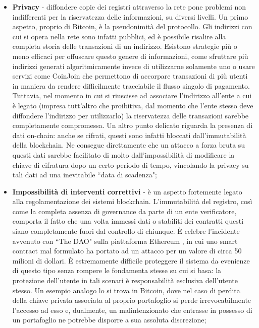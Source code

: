 \begin{itemize}
				\item \textbf{Privacy} - diffondere copie dei registri attraverso la rete pone problemi non indifferenti per la riservatezza delle informazioni, su diversi livelli. Un primo aspetto, proprio di Bitcoin, è la pseudonimità del protocollo. Gli indirizzi con cui si opera nella rete sono infatti pubblici, ed è possibile risalire alla completa storia delle transazioni di un indirizzo. Esistono strategie più o meno efficaci per offuscare questo genere di informazioni, come sfruttare più indirizzi generati algoritmicamente invece di utilizzarne solamente uno o usare servizi come CoinJoin che permettono di accorpare transazioni di più utenti in maniera da rendere difficilmente tracciabile il flusso singolo di pagamento. Tuttavia, nel momento in cui si riuscisse ad associare l'indirizzo all'ente a cui è legato (impresa tutt'altro che proibitiva, dal momento che l'ente stesso deve diffondere l'indirizzo per utilizzarlo) la riservatezza delle transazioni sarebbe completamente compromessa. Un altro punto delicato riguarda la presenza di dati on-chain: anche se cifrati, questi sono infatti bloccati dall'immutabilità della blockchain. Ne consegue direttamente che un attacco a forza bruta su questi dati sarebbe facilitato di molto dall'impossibilità di modificare la chiave di cifratura dopo un certo periodo di tempo, vincolando la privacy su tali dati ad una inevitabile ``data di scadenza"; 
				\item \textbf{Impossibilità di interventi correttivi} - è un aspetto fortemente legato alla regolamentazione dei sistemi blockchain. L'immutabilità del registro, così come la completa assenza di governance da parte di un ente verificatore, comporta il fatto che una volta immessi dati o stabiliti dei contratti questi siano completamente fuori dal controllo di chiunque. È celebre l'incidente avvenuto con ``The DAO" sulla piattaforma Ethereum \cite{theDAO}, in cui uno smart contract mal formulato ha portato ad un attacco per un valore di circa 50 milioni di dollari. È estremamente difficile proteggere il sistema da evenienze di questo tipo senza rompere le fondamenta stesse su cui si basa: la protezione dell'utente in tali scenari è responsabilità esclusiva dell'utente stesso. Un esempio analogo lo si trova in Bitcoin, dove nel caso di perdita della chiave privata associata al proprio portafoglio si perde irrevocabilmente l'accesso ad esso e, dualmente, un malintenzionato che entrasse in possesso di un portafoglio ne potrebbe disporre a sua assoluta discrezione;

\end{itemize}
